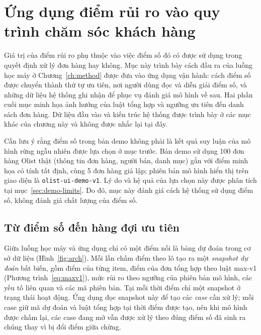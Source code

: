 
\section{Ứng dụng điểm rủi ro vào quy trình chăm sóc khách hàng}\label{sec:demo}

Giá trị của điểm rủi ro phụ thuộc vào việc điểm số đó có được sử dụng trong quyết định xử lý đơn hàng hay không. Mục này trình bày cách đầu ra của luồng học máy ở Chương~\ref{ch:method} được đưa vào ứng dụng vận hành: cách điểm số được chuyển thành thứ tự ưu tiên, nơi người dùng đọc và diễn giải điểm số, và những dữ liệu hệ thống ghi nhận để phục vụ đánh giá mô hình về sau. Hai phần cuối mục minh họa ảnh hưởng của luật tổng hợp và ngưỡng ưu tiên đến danh sách đơn hàng. Dữ liệu đầu vào và kiến trúc hệ thống được trình bày ở các mục khác của chương này và không được nhắc lại tại đây.

Cần lưu ý rằng điểm số trong bản demo không phải là kết quả suy luận của mô hình rừng ngẫu nhiên được lựa chọn ở mục trước. Bản demo sử dụng 100 đơn hàng Olist thật (thông tin đơn hàng, người bán, danh mục) gắn với điểm minh họa có tính tất định, cùng 5 đơn hàng giả lập; phiên bản mô hình hiển thị trên giao diện là \texttt{olist-ui-demo-v1}. Lý do và hệ quả của lựa chọn này được phân tích tại mục~\ref{sec:demo-limits}. Do đó, mục này đánh giá cách hệ thống sử dụng điểm số, không đánh giá chất lượng của điểm số.

\subsection{Từ điểm số đến hàng đợi ưu tiên}

Giữa luồng học máy và ứng dụng chỉ có một điểm nối là bảng dự đoán trong cơ sở dữ liệu (Hình~\ref{fig:arch}). Mỗi lần chấm điểm theo lô tạo ra một \emph{snapshot dự đoán} bất biến, gồm điểm của từng item, điểm của đơn tổng hợp theo luật max-v1 (Phương trình~\ref{eq:maxv1}), mức rủi ro theo ngưỡng của phiên bản mô hình, các yếu tố liên quan và các mã phiên bản. Tại mỗi thời điểm chỉ một snapshot ở trạng thái hoạt động. Ứng dụng đọc snapshot này để tạo các \emph{case} cần xử lý; mỗi case giữ mã dự đoán và luật tổng hợp tại thời điểm được tạo, nên khi mô hình được chấm lại, các case đang mở vẫn được xử lý theo đúng điểm số đã sinh ra chúng thay vì bị đổi điểm giữa chừng.

